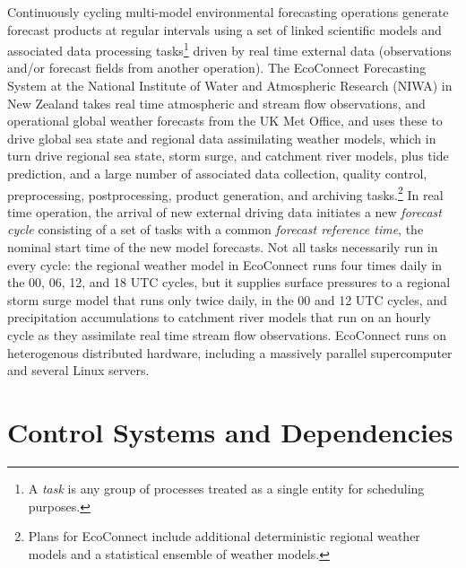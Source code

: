 \documentclass[11pt,a4paper]{article}
\begin{document}
Continuously cycling multi-model environmental forecasting operations
generate forecast products at regular intervals using a set of linked
scientific models and associated data processing tasks\footnote{A {\em
task} is any group of processes treated as a single entity for
scheduling purposes.} driven by real time external data (observations
and/or forecast fields from another operation). The EcoConnect
Forecasting System at the National Institute of Water and Atmospheric
Research (NIWA) in New Zealand takes real time atmospheric and stream
flow observations, and operational global weather forecasts from the UK
Met Office, and uses these to drive global sea state and regional data
assimilating weather models, which in turn drive regional sea state,
storm surge, and catchment river models, plus tide prediction, and a
large number of associated data collection, quality control,
preprocessing, postprocessing, product generation, and archiving
tasks.\footnote{Plans for EcoConnect include additional deterministic
regional weather models and a statistical ensemble of weather models.}
In real time operation, the arrival of new external driving data
initiates a new {\em forecast cycle} consisting of a set of tasks with a
common {\em forecast reference time}, the nominal start time of the new
model forecasts. Not all tasks necessarily run in every cycle: the
regional weather model in EcoConnect runs four times daily in the 00,
06, 12, and 18 UTC cycles, but it supplies surface pressures to a
regional storm surge model that runs only twice daily, in the 00 and 12
UTC cycles, and precipitation accumulations to catchment river models
that run on an hourly cycle as they assimilate real time stream flow
observations.  EcoConnect runs on heterogenous distributed hardware,
including a massively parallel supercomputer and several Linux servers. 

\section{Control Systems and Dependencies}
\end{document}
